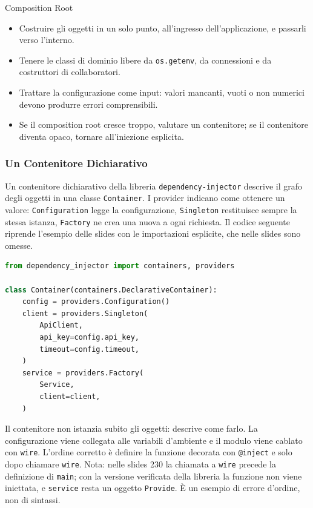 \documentclass[12pt]{extarticle}
\begin{document}
\begin{cbox}{Composition Root}
\begin{itemize}
    \item Costruire gli oggetti in un solo punto, all'ingresso dell'applicazione, e passarli verso l'interno.
    \item Tenere le classi di dominio libere da \texttt{os.getenv}, da connessioni e da costruttori di collaboratori.
    \item Trattare la configurazione come input: valori mancanti, vuoti o non numerici devono produrre errori comprensibili.
    \item Se il composition root cresce troppo, valutare un contenitore; se il contenitore diventa opaco, tornare all'iniezione esplicita.
\end{itemize}
\end{cbox}

\subsubsection{Un Contenitore Dichiarativo}

\noindent Un contenitore dichiarativo della libreria \texttt{dependency-injector} descrive il grafo degli oggetti in una classe \texttt{Container}. I provider indicano come ottenere un valore: \texttt{Configuration} legge la configurazione, \texttt{Singleton} restituisce sempre la stessa istanza, \texttt{Factory} ne crea una nuova a ogni richiesta. Il codice seguente riprende l'esempio delle slides con le importazioni esplicite, che nelle slides sono omesse.

\begin{lstlisting}[language=Python]
from dependency_injector import containers, providers

class Container(containers.DeclarativeContainer):
    config = providers.Configuration()
    client = providers.Singleton(
        ApiClient,
        api_key=config.api_key,
        timeout=config.timeout,
    )
    service = providers.Factory(
        Service,
        client=client,
    )
\end{lstlisting}

\noindent Il contenitore non istanzia subito gli oggetti: descrive come farlo. La configurazione viene collegata alle variabili d'ambiente e il modulo viene cablato con \texttt{wire}. L'ordine corretto è definire la funzione decorata con \texttt{@inject} e solo dopo chiamare \texttt{wire}. Nota: nelle slides 230 la chiamata a \texttt{wire} precede la definizione di \texttt{main}; con la versione verificata della libreria la funzione non viene iniettata, e \texttt{service} resta un oggetto \texttt{Provide}. È un esempio di errore d'ordine, non di sintassi.
\end{document}
